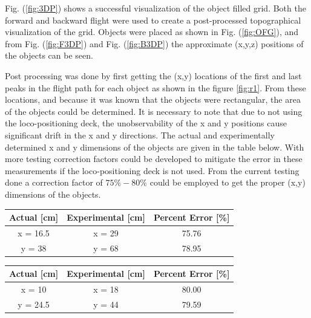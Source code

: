 Fig. (\ref{fig:3DP}) shows a successful visualization of the object filled grid. Both the forward and backward flight were used to create a post-processed topographical visualization of the grid. Objects were placed as shown in Fig. (\ref{fig:OFG}), and from Fig. (\ref{fig:F3DP}) and Fig. (\ref{fig:B3DP}) the approximate (x,y,z) positions of the objects can be seen. 

Post processing was done by first getting the (x,y) locations of the first and last peaks in the flight path for each object as shown in the figure \ref{fig:r1}. From these locations, and because it was known that the objects were rectangular, the area of the objects could be determined. It is necessary to note that due to not using the loco-positioning deck, the unobservability of the x and y positions cause significant drift in the x and y directions. The actual and experimentally determined x and y dimensions of the objects are given in the table below. With more testing correction factors could be developed to mitigate the error in these measurements if the loco-positioning deck is not used. From the current testing done a correction factor of $75\%-80\%$ could be employed to get the proper (x,y) dimensions of the objects.

\begin{center}

    \begin{tabular}{|c|c|c|}
        \rowcolor{lightgray} 
        \hline
        \textbf{Actual [cm]} & \textbf{Experimental [cm]} & \textbf{Percent Error [\%]} \\
        \hline
        x = 16.5 & x = 29 & 75.76 \\
        \hline
        y = 38 & y = 68 &  78.95 \\
        \hline
\end{tabular}
\end{center}

\begin{center}

    \begin{tabular}{|c|c|c|}
        \rowcolor{lightgray} 
        \hline
        \textbf{Actual [cm]} & \textbf{Experimental [cm]} & \textbf{Percent Error [\%]} \\
        \hline
        x = 10 & x = 18 & 80.00 \\
        \hline
        y = 24.5 & y = 44 & 79.59\\
        \hline
\end{tabular}
\end{center}

